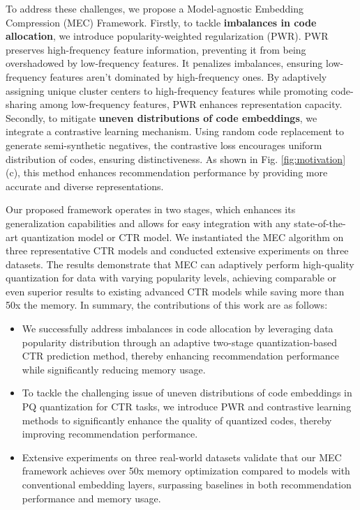    To address these challenges, we propose a Model-agnostic Embedding Compression (MEC) Framework. 
    Firstly, to tackle \textbf{imbalances in code allocation}, we introduce popularity-weighted regularization (PWR). PWR preserves high-frequency feature information, preventing it from being overshadowed by low-frequency features. 
    It penalizes imbalances, ensuring low-frequency features aren't dominated by high-frequency ones. 
    By adaptively assigning unique cluster centers to high-frequency features while promoting code-sharing among low-frequency features, PWR enhances representation capacity. 
    Secondly, to mitigate \textbf{uneven distributions of code embeddings}, we integrate a contrastive learning mechanism.  
    Using random code replacement to generate semi-synthetic negatives, the contrastive loss encourages uniform distribution of codes, ensuring distinctiveness. 
    As shown in Fig. \ref{fig:motivation} (c), this method enhances recommendation performance by providing more accurate and diverse representations.
    
    

    Our proposed framework operates in two stages, which enhances its generalization capabilities and allows for easy integration with any state-of-the-art quantization model or CTR model. 
    We instantiated the MEC algorithm on three representative CTR models and conducted extensive experiments on three datasets. The results demonstrate that MEC can adaptively perform high-quality quantization for data with varying popularity levels, achieving comparable or even superior results to existing advanced CTR models while saving more than 50x the memory.
    In summary, the contributions of this work are as follows:
    \begin{itemize}[leftmargin=*,align=left]
        \item We successfully address imbalances in code allocation by leveraging data popularity distribution through an adaptive two-stage quantization-based CTR prediction method, thereby enhancing recommendation performance while significantly reducing memory usage.
        \item To tackle the challenging issue of uneven distributions of code embeddings in PQ quantization for CTR tasks, we introduce PWR and contrastive learning methods to significantly enhance the quality of quantized codes, thereby improving recommendation performance.
        \item Extensive experiments on three real-world datasets validate that our MEC framework achieves over 50x memory optimization compared to models with conventional embedding layers, surpassing baselines in both recommendation performance and memory usage.
    \end{itemize}